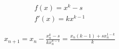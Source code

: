 \documentclass{style}
\begin{document}
\begin{gather*}
	f(x) = x^k - s \\
	f'(x) = kx^{k - 1}
\end{gather*}

\begin{gather*}
	x_{n + 1} = x_n - \frac{x_n^k - s}{kx_n^{k - 1}} = \frac{x_n(k - 1) + sx_n^{1 - k}}{k}
\end{gather*}
\end{document}
